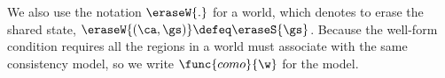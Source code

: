 We also use the notation \( \eraseW{.}\) for a world, which denotes to erase the shared state, \ie \( \eraseW{(\ca, \gs)} \defeq \eraseS{\gs}\).
Because the well-form condition requires all the regions in a world must associate with the same consistency model, so we write \( \func{como}{\w} \) for the model.


